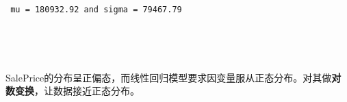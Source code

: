 \documentclass[11pt]{article}
\begin{document}
    \begin{Verbatim}[commandchars=\\\{\}]

 mu = 180932.92 and sigma = 79467.79

    \end{Verbatim}

    \begin{center}
    \end{center}
    { \hspace*{\fill} \\}
    
    \begin{center}
    \end{center}
    { \hspace*{\fill} \\}
    
    SalePrice的分布呈正偏态，而线性回归模型要求因变量服从正态分布。对其做\textbf{对数变换}，让数据接近正态分布。
\end{document}

